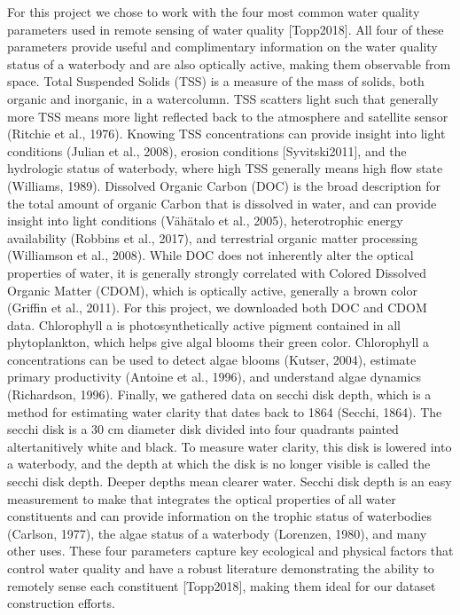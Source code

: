 \documentclass[]{article}
\begin{document}
For this project we chose to work with the four most common water
quality parameters used in remote sensing of water quality
{[}Topp2018{]}. All four of these parameters provide useful and
complimentary information on the water quality status of a waterbody and
are also optically active, making them observable from space. Total
Suspended Solids (TSS) is a measure of the mass of solids, both organic
and inorganic, in a watercolumn. TSS scatters light such that generally
more TSS means more light reflected back to the atmosphere and satellite
sensor (Ritchie et al., 1976). Knowing TSS concentrations can provide
insight into light conditions (Julian et al., 2008), erosion conditions
{[}Syvitski2011{]}, and the hydrologic status of waterbody, where high
TSS generally means high flow state (Williams, 1989). Dissolved Organic
Carbon (DOC) is the broad description for the total amount of organic
Carbon that is dissolved in water, and can provide insight into light
conditions (Vähätalo et al., 2005), heterotrophic energy availability
(Robbins et al., 2017), and terrestrial organic matter processing
(Williamson et al., 2008). While DOC does not inherently alter the
optical properties of water, it is generally strongly correlated with
Colored Dissolved Organic Matter (CDOM), which is optically active,
generally a brown color (Griffin et al., 2011). For this project, we
downloaded both DOC and CDOM data. Chlorophyll a is photosynthetically
active pigment contained in all phytoplankton, which helps give algal
blooms their green color. Chlorophyll a concentrations can be used to
detect algae blooms (Kutser, 2004), estimate primary productivity
(Antoine et al., 1996), and understand algae dynamics (Richardson,
1996). Finally, we gathered data on secchi disk depth, which is a method
for estimating water clarity that dates back to 1864 (Secchi, 1864). The
secchi disk is a 30 cm diameter disk divided into four quadrants painted
altertanitively white and black. To measure water clarity, this disk is
lowered into a waterbody, and the depth at which the disk is no longer
visible is called the secchi disk depth. Deeper depths mean clearer
water. Secchi disk depth is an easy measurement to make that integrates
the optical properties of all water constituents and can provide
information on the trophic status of waterbodies (Carlson, 1977), the
algae status of a waterbody (Lorenzen, 1980), and many other uses. These
four parameters capture key ecological and physical factors that control
water quality and have a robust literature demonstrating the ability to
remotely sense each constituent {[}Topp2018{]}, making them ideal for
our dataset construction efforts.
\end{document}
